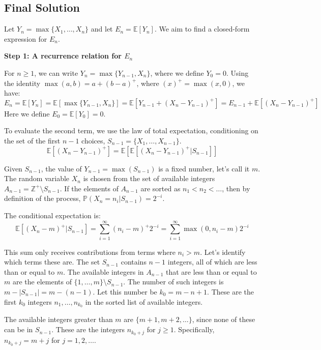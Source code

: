 \documentclass[12pt,a4paper]{article}
\theoremstyle{definition}
\begin{document}
    \subsection{Final Solution}
        Let $Y_n = \max\{X_1, \dots, X_n\}$ and let $E_n = \mathbb{E}[Y_n]$. We aim to find a closed-form expression for $E_n$.

        \textbf{Step 1: A recurrence relation for $E_n$}

        For $n \geq 1$, we can write $Y_n = \max\{Y_{n-1}, X_n\}$, where we define $Y_0 = 0$. Using the identity $\max(a,b) = a + (b-a)^+$, where $(x)^+ = \max(x,0)$, we have:
        \[ E_n = \mathbb{E}[Y_n] = \mathbb{E}[\max\{Y_{n-1}, X_n\}] = \mathbb{E}[Y_{n-1} + (X_n - Y_{n-1})^+] = E_{n-1} + \mathbb{E}[(X_n - Y_{n-1})^+] \]
        Here we define $E_0 = \mathbb{E}[Y_0]=0$.

        To evaluate the second term, we use the law of total expectation, conditioning on the set of the first $n-1$ choices, $S_{n-1} = \{X_1, \dots, X_{n-1}\}$.
        \[ \mathbb{E}[(X_n - Y_{n-1})^+] = \mathbb{E}\left[ \mathbb{E}[(X_n - Y_{n-1})^+ | S_{n-1}] \right] \]

        Given $S_{n-1}$, the value of $Y_{n-1} = \max(S_{n-1})$ is a fixed number, let's call it $m$. The random variable $X_n$ is chosen from the set of available integers $A_{n-1} = \mathbb{Z}^+ \setminus S_{n-1}$. If the elements of $A_{n-1}$ are sorted as $n_1 < n_2 < \dots$, then by definition of the process, $\mathbb{P}(X_n = n_i | S_{n-1}) = 2^{-i}$.

        The conditional expectation is:
        \[ \mathbb{E}[(X_n - m)^+ | S_{n-1}] = \sum_{i=1}^{\infty} (n_i - m)^+ 2^{-i} = \sum_{i=1}^{\infty} \max(0, n_i - m) 2^{-i} \]

        This sum only receives contributions from terms where $n_i > m$. Let's identify which terms these are. The set $S_{n-1}$ contains $n-1$ integers, all of which are less than or equal to $m$. The available integers in $A_{n-1}$ that are less than or equal to $m$ are the elements of $\{1, \dots, m\} \setminus S_{n-1}$. The number of such integers is $m - |S_{n-1}| = m - (n-1)$. Let this number be $k_0 = m-n+1$. These are the first $k_0$ integers $n_1, \dots, n_{k_0}$ in the sorted list of available integers.

        The available integers greater than $m$ are $\{m+1, m+2, \dots\}$, since none of these can be in $S_{n-1}$. These are the integers $n_{k_0+j}$ for $j \geq 1$. Specifically, $n_{k_0+j} = m+j$ for $j=1, 2, \dots$.
\end{document}
